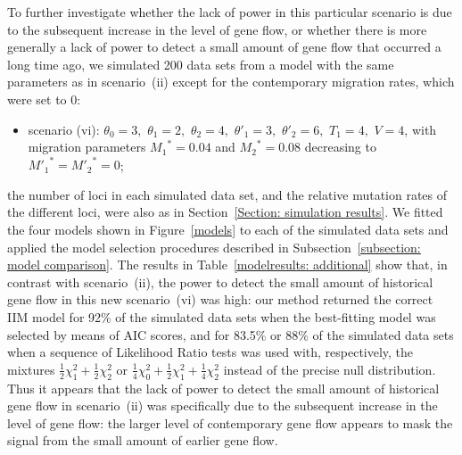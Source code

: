 \documentclass[11pt]{article}
\begin{document}
To further investigate whether the lack of power in this particular scenario is due to the subsequent increase in the level of gene flow, or whether there is more generally a lack of power to detect a small amount of gene flow that occurred a long time ago, we simulated 200 data sets from a model with the same parameters as in scenario~(ii) except for the contemporary migration rates, which were set to 0:  
\begin{itemize}
\item scenario (vi): 
$\theta_0=3,\,\, \theta_1=2,\,\, \theta_2=4,\,\, \theta'_1=3,\,\, \theta'_2=6,\,\,T_1=4,\,\, V=4$, with migration parameters ${M_1}^{\!*}=0.04$ and ${M_2}^{\!*}=0.08$ decreasing to ${M'_1}^{*}={M'_2}^{*}=0$;
\end{itemize}
 the number of loci in each simulated data set, and the relative mutation rates of the different loci, were also as in Section~\ref{Section: simulation results}. We fitted the four models shown in Figure~\ref{models} to each of the simulated data sets and applied the model selection procedures described in Subsection~\ref{subsection: model comparison}. 
The results in Table~\ref{modelresults: additional} show that, in contrast with scenario~(ii), the power to detect the small amount of historical gene flow in this new scenario~(vi) was high:
our method returned the correct IIM model for 92\% of the simulated data sets when the best-fitting model was selected by means of AIC scores, and for 83.5\% or 88\% of the simulated data sets when a sequence of Likelihood Ratio tests was used with, respectively, the mixtures $\frac{1}{2} \chi^2_1 +\frac{1}{2} \chi^2_2$  or $\frac{1}{4} \chi^2_0 +\frac{1}{2} \chi^2_1 +\frac{1}{4} \chi^2_2$ instead of the precise null distribution.
Thus it appears that the lack of power to detect 
the small amount of historical gene flow
in scenario~(ii) was specifically due to the subsequent increase in the level of gene flow: the larger level of contemporary
gene flow appears to mask the signal from the small amount of earlier gene flow.
\end{document}
